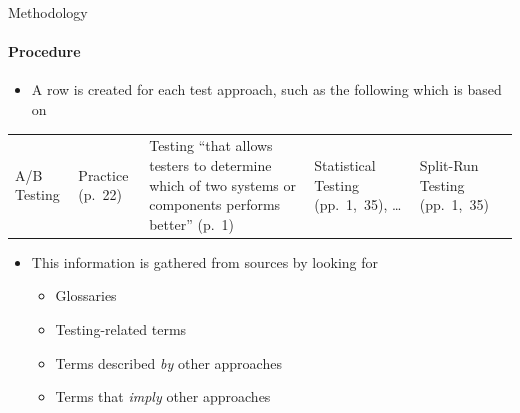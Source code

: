 \documentclass{beamer}
\begin{document}
\begin{frame}{Methodology}
    \framesubtitle{Procedure}
    \begin{itemize}
        \item A row is created for each test approach, such as the following which is based on \citep{IEEE2022}
    \end{itemize}
    \begin{center}
        \small
        \begin{tabularx}{\linewidth}{|M{1.1cm}|M{1.4cm}|X|M{1.7cm}|M{1.8cm}|}
            \hline
             &  &                                                                             &                &    \\
            \hline
            A/B Testing           & Practice (p.~22)          & Testing ``that allows testers to determine which of two systems or components performs better'' (p.~1) & Statistical Testing (pp.~1,~35), \dots{} & Split-Run Testing (pp.~1,~35) \\
            \hline
        \end{tabularx}
    \end{center}
    \pause
    \begin{itemize}
        \item This information is gathered from sources by looking for
              \begin{itemize}
                  \item Glossaries
                  \item Testing-related terms
                  \item Terms described \emph{by} other approaches
                  \item Terms that \emph{imply} other approaches
              \end{itemize}
    \end{itemize}
\end{frame}

\end{document}
